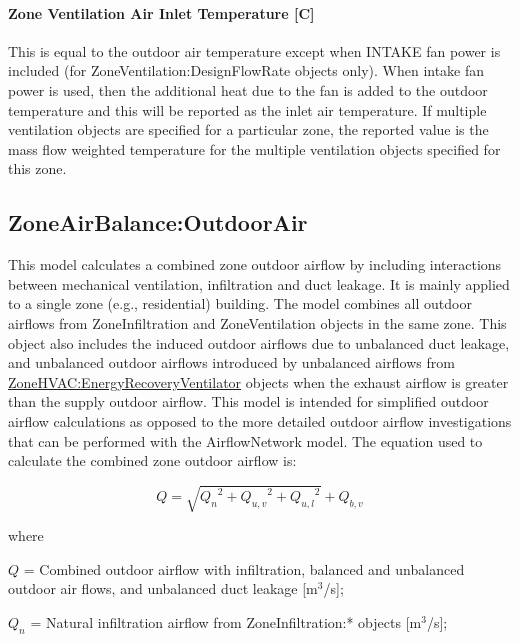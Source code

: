 \paragraph{Zone Ventilation Air Inlet Temperature {[}C{]}}\label{zone-ventilation-air-inlet-temperature-c}

This is equal to the outdoor air temperature except when INTAKE fan power is included (for ZoneVentilation:DesignFlowRate objects only). When intake fan power is used, then the additional heat due to the fan is added to the outdoor temperature and this will be reported as the inlet air temperature. If multiple ventilation objects are specified for a particular zone, the reported value is the mass flow weighted temperature for the multiple ventilation objects specified for this zone.

\subsection{ZoneAirBalance:OutdoorAir}\label{zoneairbalanceoutdoorair}

This model calculates a combined zone outdoor airflow by including interactions between mechanical ventilation, infiltration and duct leakage. It is mainly applied to a single zone (e.g., residential) building. The model combines all outdoor airflows from ZoneInfiltration and ZoneVentilation objects in the same zone. This object also includes the induced outdoor airflows due to unbalanced duct leakage, and unbalanced outdoor airflows introduced by unbalanced airflows from \hyperref[zonehvacenergyrecoveryventilator]{ZoneHVAC:EnergyRecoveryVentilator} objects when the exhaust airflow is greater than the supply outdoor airflow. This model is intended for simplified outdoor airflow calculations as opposed to the more detailed outdoor airflow investigations that can be performed with the AirflowNetwork model. The equation used to calculate the combined zone outdoor airflow is:

\begin{equation}
Q = \sqrt {{Q_n}^2 + {Q_{u,v}}^2 + {Q_{u,l}}^2}  + {Q_{b,v}}
\end{equation}

where

$Q$ = Combined outdoor airflow with infiltration, balanced and unbalanced outdoor air flows, and unbalanced duct leakage {[}m\(^{3}\)/s{]};

$Q_{n}$ = Natural infiltration airflow from ZoneInfiltration:* objects {[}m\(^{3}\)/s{]};

